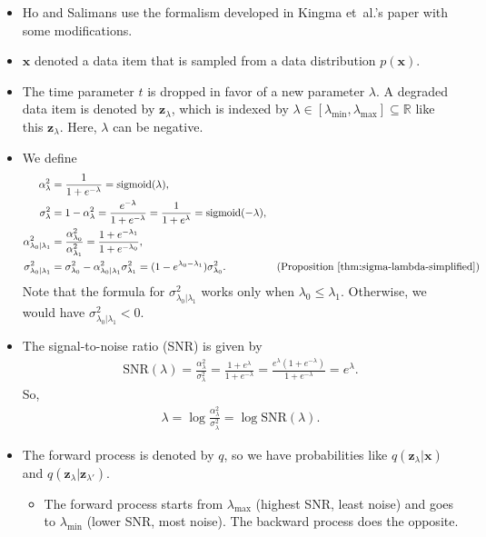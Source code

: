 \documentclass[10pt]{article}
\newcommand{\ve}[1]{\mathbf{#1}}
\newcommand{\etal}{{et~al.}}
\newcommand{\Real}{\mathbb{R}}
\newcommand{\SNR}{\mathrm{SNR}}
\newcommand{\sigmoid}{\mathrm{sigmoid}}
\begin{document}
\begin{itemize}
  \item Ho and Salimans use the formalism developed in Kingma \etal's paper \cite{Kingma:2021} with some modifications.  

  \item $\ve{x}$ denoted a data item that is sampled from a data distribution $p(\ve{x})$.
  
  \item The time parameter $t$ is dropped in favor of a new parameter $\lambda$. A degraded data item is denoted by $\ve{z}_\lambda$, which is indexed by $\lambda \in [\lambda_{\min}, \lambda_{\max}] \subseteq \Real$ like this $\ve{z}_\lambda$. Here, $\lambda$ can be negative.
  
  \item We define
  \begin{align*}
    \alpha_{\lambda}^2 
    &= \frac{1}{1 + e^{-\lambda}} = \sigmoid(\lambda), &
    \\
    \sigma_\lambda^2       
    &= 1 - \alpha^2_\lambda = \frac{e^{-\lambda}}{1 + e^{-\lambda}} = \frac{1}{1 + e^{\lambda}} = \sigmoid(-\lambda), 
    &
    \\
    \alpha^2_{\lambda_0|\lambda_1} 
    &= \frac{\alpha^2_{\lambda_0}}{\alpha^2_{\lambda_1}} = \frac{1 + e^{-\lambda_1}}{1 + e^{-\lambda_0}},
    & 
    \\
    \sigma^2_{\lambda_0|\lambda_1}
    &= \sigma^2_{\lambda_0} - \alpha^2_{\lambda_0|\lambda_1} \sigma^2_{\lambda_1} 
    = (1 - e^{\lambda_0-\lambda_1}) \sigma_{\lambda_0}^2.
    & (\mbox{Proposition~\ref{thm:sigma-lambda-simplified}})
  \end{align*}
  Note that the formula for $\sigma_{\lambda_0|\lambda_1}^2$ works only when $\lambda_0 \leq \lambda_1$. Otherwise, we would have $\sigma^2_{\lambda_0|\lambda_1} < 0$.

  \item The signal-to-noise ratio (SNR) is given by
  \begin{align*}
    \SNR(\lambda) = \frac{\alpha^2_\lambda}{\sigma^2_\lambda} = \frac{1 + e^{\lambda}}{1 + e^{-\lambda}} = \frac{e^{\lambda}(1 + e^{-\lambda})}{1 + e^{-\lambda}} = e^{\lambda}.
  \end{align*}
  So,
  \begin{align*}
    \lambda = \log \frac{\alpha_\lambda^2}{\sigma^2_\lambda} = \log \SNR(\lambda).
  \end{align*}

  \item The forward process is denoted by $q$, so we have probabilities like $q(\ve{z}_\lambda | \ve{x})$ and $q(\ve{z}_{\lambda} | \ve{z}_{\lambda'})$.
  \begin{itemize}
    \item The forward process starts from $\lambda_{\max}$ (highest SNR, least noise) and goes to $\lambda_{\min}$ (lower SNR, most noise). The backward process does the opposite.
    

\end{itemize}
\end{itemize}
\end{document}
